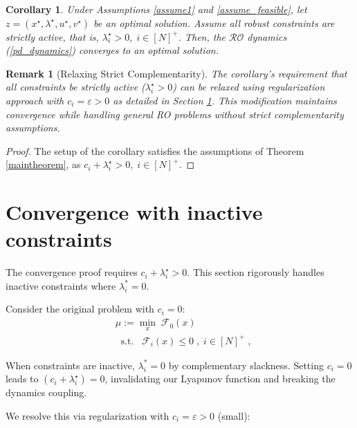 \documentclass[journal,twoside,web]{ieeecolor}
\newcommand{\rev}[1]{\textcolor{revisionblue}{#1}}
\newtheorem{corollary}{Corollary}
\newtheorem{remark}{Remark}
\begin{document}
\begin{corollary}
Under Assumptions \ref{assume1} and \ref{assume_feasible}, let $z=(x^\star,\lambda^\star,u^\star,v^\star)$ be an optimal solution.
Assume all robust constraints are strictly active, that is, $\lambda_i^\star>0,\;i\in[N]^+$. Then, the $\mathcal{RO}$ dynamics (\ref{pd_dynamics}) converges to an optimal solution.
\end{corollary}

\begin{remark}[\rev{Relaxing Strict Complementarity}]
\rev{The corollary's requirement that all constraints be strictly active ($\lambda_i^\star > 0$) can be relaxed using
regularization approach with $c_i = \varepsilon > 0$ as detailed in Section \ref{perturbed_section_pddynamics}. This modification maintains convergence while handling general RO problems without strict complementarity assumptions.}
\end{remark}
\begin{proof}
The setup of the corollary satisfies the assumptions of Theorem \ref{maintheorem}, as $c_i+\lambda_i^\star>0,\;i\in[N]^+$.
\end{proof}

\section{Convergence with inactive constraints} \label{perturbed_section_pddynamics}

The convergence proof requires $c_i+\lambda_i^\star>0$. This section rigorously handles inactive constraints where $\lambda_i^* = 0$.

Consider the original problem with $c_i=0$:
\begin{align} \label{mu_0}
&\mu:=\underset{x}{\min} \; \mathcal{F}_0(x)\\
&\;\;\text{s.t.}\;\;\;\mathcal{F}_i(x)\leq 0\;,\;i\in[N]^+\;,\nonumber
\end{align}

When constraints are inactive, $\lambda_i^* = 0$ by complementary slackness. Setting $c_i = 0$ leads to $(c_i+\lambda_i^\star)=0$, invalidating our Lyapunov function and breaking the dynamics coupling.

We resolve this via regularization with $c_i=\varepsilon>0$ (small):
\end{document}
